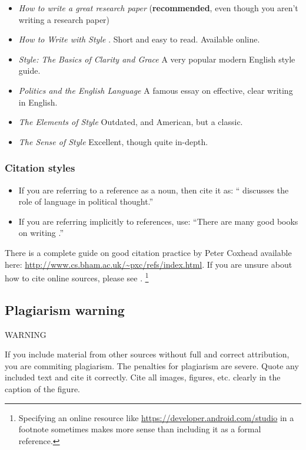 \documentclass{l4proj}
\begin{document}
\begin{itemize}
    \item
    \emph{How to write a great research paper} \cite{Pey17} (\textbf{recommended}, even though you aren't writing a research paper)
    \item
    \emph{How to Write with Style} \cite{Von80}. Short and easy to read. Available online.
    \item
    \emph{Style: The Basics of Clarity and Grace} \cite{Wil09} A very popular modern English style guide.
    \item
    \emph{Politics and the English Language} \cite{Orw68}  A famous essay on effective, clear writing in English.
    \item
    \emph{The Elements of Style} \cite{StrWhi07} Outdated, and American, but a classic.
    \item
    \emph{The Sense of Style} \cite{Pin15} Excellent, though quite in-depth.
\end{itemize}

\subsubsection{Citation styles}

\begin{itemize}
\item If you are referring to a reference as a noun, then cite it as: ``\citet{Orw68} discusses the role of language in political thought.''
\item If you are referring implicitly to references, use: ``There are many good books on writing \citep{Orw68, Wil09, Pin15}.''
\end{itemize}

There is a complete guide on good citation practice by Peter Coxhead available here: \url{http://www.cs.bham.ac.uk/~pxc/refs/index.html}. 
If you are unsure about how to cite online sources, please see \citet{UNSWWebsite}. 
\footnote{Specifying an online resource like \url{https://developer.android.com/studio}
in a footnote sometimes makes more sense than including it as a formal reference.}

\subsection{Plagiarism warning}

\begin{highlight_title}{WARNING}
    
    If you include material from other sources without full and correct attribution, you are commiting plagiarism. The penalties for plagiarism are severe.
    Quote any included text and cite it correctly. Cite all images, figures, etc. clearly in the caption of the figure.
\end{highlight_title}
\end{document}
